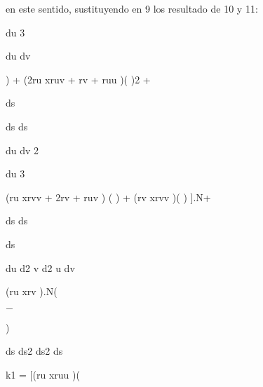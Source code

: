 \documentclass[a4paper,portrait,12pt]{article}
\begin{document}
\begin{flushleft}
en este sentido, sustituyendo en 9 los resultado de 10 y 11:
\end{flushleft}


\begin{flushleft}
du 3
\end{flushleft}


\begin{flushleft}
du dv
\end{flushleft}


\begin{flushleft}
) + (2ru xruv + rv + ruu )( )2 +
\end{flushleft}


\begin{flushleft}
ds
\end{flushleft}


\begin{flushleft}
ds ds
\end{flushleft}


\begin{flushleft}
du dv 2
\end{flushleft}


\begin{flushleft}
du 3
\end{flushleft}


\begin{flushleft}
(ru xrvv + 2rv + ruv ) ( ) + (rv xrvv )( ) ].N+
\end{flushleft}


\begin{flushleft}
ds ds
\end{flushleft}


\begin{flushleft}
ds
\end{flushleft}


\begin{flushleft}
du d2 v d2 u dv
\end{flushleft}


\begin{flushleft}
(ru xrv ).N(
\end{flushleft}


$-$


)


\begin{flushleft}
ds ds2 ds2 ds
\end{flushleft}





\begin{flushleft}
k1 = [(ru xruu )(
\end{flushleft}
\end{document}
